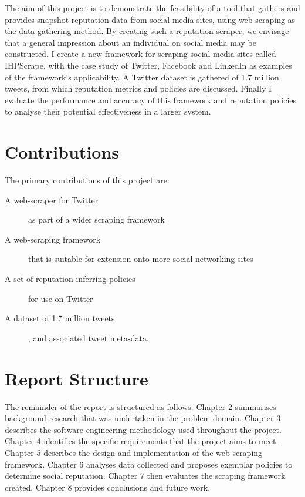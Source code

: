 The aim of this project is to demonstrate the feasibility of a tool that gathers and provides snapshot reputation data from social media sites, using web-scraping as the data gathering method. By creating such a reputation scraper, we envisage that a general impression about an individual on social media may be constructed. I create a new framework for scraping social media sites called IHPScrape, with the case study of Twitter, Facebook and LinkedIn as examples of the framework's applicability. A Twitter dataset is gathered of 1.7 million tweets, from which reputation metrics and policies are discussed. Finally I evaluate the performance and accuracy of this framework and reputation policies to analyse their potential effectiveness in a larger system.

\section{Contributions}
The primary contributions of this project are:

\begin{description}
	\item [A web-scraper for Twitter] as part of a wider scraping framework
	
	\item [A web-scraping framework] that is suitable for extension onto more social networking sites
	
	\item [A set of reputation-inferring policies] for use on Twitter 
	
	\item [A dataset of 1.7 million tweets], and associated tweet meta-data.
\end{description}

\section{Report Structure}

The remainder of the report is structured as follows. Chapter 2 summarises background research that was undertaken in the problem domain. Chapter 3 describes the software engineering methodology used throughout the project. Chapter 4 identifies the specific requirements that the project aims to meet. Chapter 5 describes the design and implementation of the web scraping framework. Chapter 6 analyses data collected and proposes exemplar policies to determine social reputation. Chapter 7 then evaluates the scraping framework created. Chapter 8 provides conclusions and future work.

